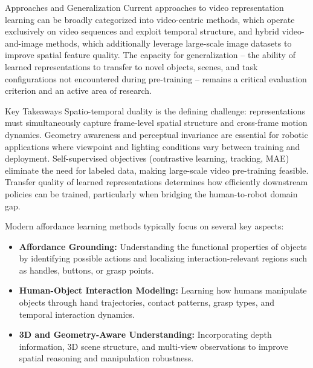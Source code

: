Approaches and Generalization
Current approaches to video representation learning can be broadly categorized into video-centric methods, which operate exclusively on video sequences and exploit temporal structure, and hybrid video-and-image methods, which additionally leverage large-scale image datasets to improve spatial feature quality. The capacity for generalization -- the ability of learned representations to transfer to novel objects, scenes, and task configurations not encountered during pre-training -- remains a critical evaluation criterion and an active area of research.

Key Takeaways
Spatio-temporal duality is the defining challenge: representations must simultaneously capture frame-level spatial structure and cross-frame motion dynamics.
Geometry awareness and perceptual invariance are essential for robotic applications where viewpoint and lighting conditions vary between training and deployment.
Self-supervised objectives (contrastive learning, tracking, MAE) eliminate the need for labeled data, making large-scale video pre-training feasible.
Transfer quality of learned representations determines how efficiently downstream policies can be trained, particularly when bridging the human-to-robot domain gap.











Modern affordance learning methods typically focus on several key aspects:

\begin{itemize}
    \item \textbf{Affordance Grounding:} Understanding the functional properties of objects by identifying possible actions and localizing interaction-relevant regions such as handles, buttons, or grasp points.
    
    \item \textbf{Human-Object Interaction Modeling:} Learning how humans manipulate objects through hand trajectories, contact patterns, grasp types, and temporal interaction dynamics.
    
    \item \textbf{3D and Geometry-Aware Understanding:} Incorporating depth information, 3D scene structure, and multi-view observations to improve spatial reasoning and manipulation robustness.
\end{itemize}



